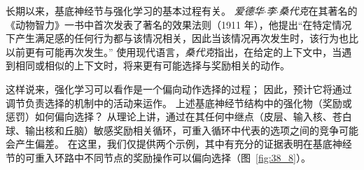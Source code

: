 长期以来，基底神经节与强化学习的基本过程有关。
\textit{爱德华$\cdot$李$\cdot$桑代克}在其著名的《动物智力》一书中首次发表了著名的效果法则（1911 年），他提出“在特定情况下产生满足感的任何行为都与该情况相关，因此当该情况再次发生时，该行为也比以前更有可能再次发生。”
使用现代语言，\textit{桑代克}指出，在给定的上下文中，当遇到相同或相似的上下文时，将来更有可能选择与奖励相关的动作。


这样说来，强化学习可以看作是一个偏向动作选择的过程；
因此，预计它将通过调节负责选择的机制中的活动来运作。
上述基底神经节结构中的强化物（奖励或惩罚）如何偏向选择？
从理论上讲，通过在其任何中继点（皮层、输入核、苍白球、输出核和丘脑）敏感奖励相关循环，可重入循环中代表的选项之间的竞争可能会产生偏差。
在这里，我们仅提供两个示例，其中有充分的证据表明在基底神经节的可重入环路中不同节点的奖励操作可以偏向选择（图~\ref{fig:38_8}）。


